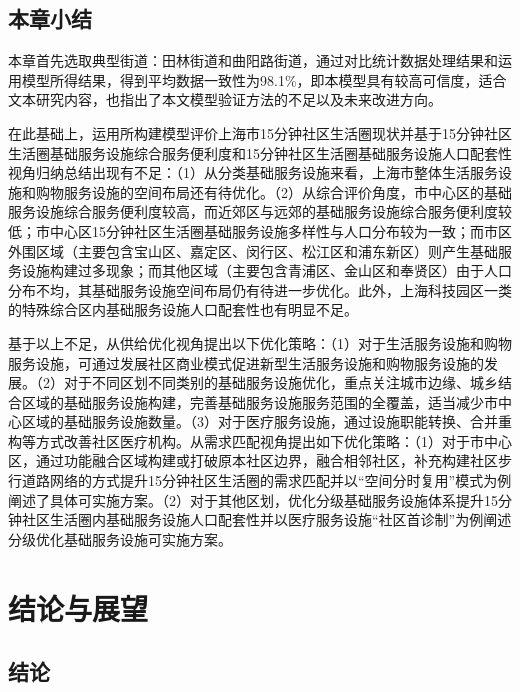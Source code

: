 \documentclass{shnuthesis}
\begin{document}
\section{本章小结}

本章首先选取典型街道：田林街道和曲阳路街道，通过对比统计数据处理结果和运用模型所得结果，得到平均数据一致性为98.1\%，即本模型具有较高可信度，适合文本研究内容，也指出了本文模型验证方法的不足以及未来改进方向。

在此基础上，运用所构建模型评价上海市15分钟社区生活圈现状并基于15分钟社区生活圈基础服务设施综合服务便利度和15分钟社区生活圈基础服务设施人口配套性视角归纳总结出现有不足：（1）从分类基础服务设施来看，上海市整体生活服务设施和购物服务设施的空间布局还有待优化。（2）从综合评价角度，市中心区的基础服务设施综合服务便利度较高，而近郊区与远郊的基础服务设施综合服务便利度较低；市中心区15分钟社区生活圈基础服务设施多样性与人口分布较为一致；而市区外围区域（主要包含宝山区、嘉定区、闵行区、松江区和浦东新区）则产生基础服务设施构建过多现象；而其他区域（主要包含青浦区、金山区和奉贤区）由于人口分布不均，其基础服务设施空间布局仍有待进一步优化。此外，上海科技园区一类的特殊综合区内基础服务设施人口配套性也有明显不足。

基于以上不足，从供给优化视角提出以下优化策略：（1）对于生活服务设施和购物服务设施，可通过发展社区商业模式促进新型生活服务设施和购物服务设施的发展。（2）对于不同区划不同类别的基础服务设施优化，重点关注城市边缘、城乡结合区域的基础服务设施构建，完善基础服务设施服务范围的全覆盖，适当减少市中心区域的基础服务设施数量。（3）对于医疗服务设施，通过设施职能转换、合并重构等方式改善社区医疗机构。从需求匹配视角提出如下优化策略：（1）对于市中心区，通过功能融合区域构建或打破原本社区边界，融合相邻社区，补充构建社区步行道路网络的方式提升15分钟社区生活圈的需求匹配并以“空间分时复用”模式为例阐述了具体可实施方案。（2）对于其他区划，优化分级基础服务设施体系提升15分钟社区生活圈内基础服务设施人口配套性并以医疗服务设施“社区首诊制”为例阐述分级优化基础服务设施可实施方案。
	

\chapter{结论与展望}

\section{结论}
\end{document}
